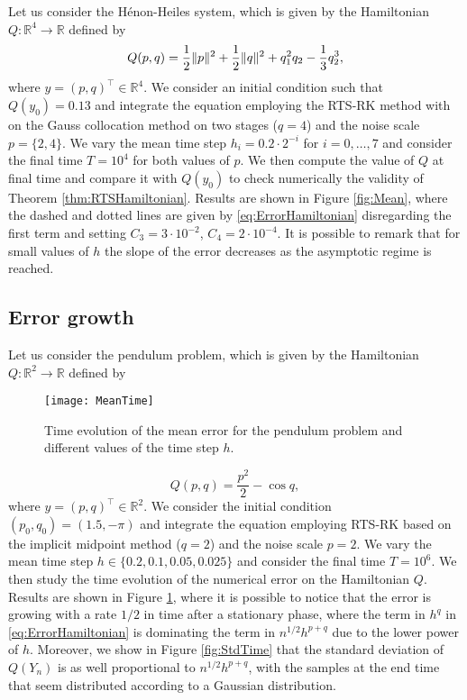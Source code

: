\documentclass{siamart1116}
\numberwithin{theorem}{section}
\DeclarePairedDelimiter{\norm}{\|}{\|}
\newcommand{\R}{\mathbb{R}}
\begin{document}
Let us consider the Hénon-Heiles system, which is given by the Hamiltonian $Q \colon \R^4 \to \R$ defined by
\begin{equation}\label{eq:HamHH}
	Q(p, q) = \frac{1}{2}\norm{p}^2 + \frac{1}{2}\norm{q}^2 + q_1^2q_2 - \frac{1}{3}q_2^3,
\end{equation}
where $y = (p, q)^\top \in \R^4$. We consider an initial condition such that $Q(y_0) = 0.13$ and integrate the equation employing the RTS-RK method with on the Gauss collocation method on two stages ($q = 4$) and the noise scale $p = \{2, 4\}$. We vary the mean time step $h_i = 0.2 \cdot 2^{-i}$ for $i = 0, \ldots, 7$ and consider the final time $T = 10^4$ for both values of $p$. We then compute the value of $Q$ at final time and compare it with $Q(y_0)$ to check numerically the validity of Theorem \ref{thm:RTSHamiltonian}. Results are shown in Figure \ref{fig:Mean}, where the dashed and dotted lines are given by \eqref{eq:ErrorHamiltonian} disregarding the first term and setting $C_3 = 3\cdot 10^{-2}$, $C_4 = 2\cdot 10^{-4}$. It is possible to remark that for small values of $h$ the slope of the error decreases as the asymptotic regime is reached.

\subsection{Error growth} Let us consider the pendulum problem, which is given by the Hamiltonian $Q \colon \R^2 \to \R$ defined by

\begin{figure}[t]
	\centering
	\texttt{[image: MeanTime]}
	\caption{Time evolution of the mean error for the pendulum problem and different values of the time step $h$.}
	\label{fig:MeanTime}	
\end{figure}

\begin{equation}
Q(p, q) = \frac{p^2}{2} - \cos q,
\end{equation}
where $y = (p, q)^\top \in \R^2$. We consider the initial condition $(p_0, q_0) = (1.5, -\pi)$ and integrate the equation employing RTS-RK based on the implicit midpoint method ($q = 2$) and the noise scale $p = 2$. We vary the mean time step $h \in \{0.2, 0.1, 0.05, 0.025\}$ and consider the final time $T = 10^6$. We then study the time evolution of the numerical error on the Hamiltonian $Q$. Results are shown in Figure \ref{fig:MeanTime}, where it is possible to notice that the error is growing with a rate $1/2$ in time after a stationary phase, where the term in $h^q$ in \eqref{eq:ErrorHamiltonian} is dominating the term in $n^{1/2}h^{p+q}$ due to the lower power of $h$. Moreover, we show in Figure \ref{fig:StdTime} that the standard deviation of $Q(Y_n)$ is as well proportional to $n^{1/2}h^{p+q}$, with the samples at the end time that seem distributed according to a Gaussian distribution.
\end{document}
